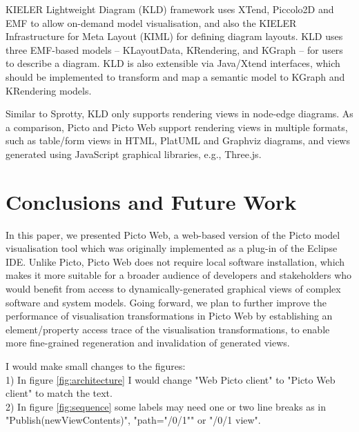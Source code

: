 \documentclass[sigconf,review]{acmart}
\begin{document}
KIELER Lightweight Diagram (KLD) framework \cite{schneider2013just} uses XTend, Piccolo2D and EMF to allow on-demand model visualisation, and also the KIELER Infrastructure for Meta Layout (KIML) for defining diagram layouts. KLD uses three EMF-based models -- KLayoutData, KRendering, and KGraph -- for users to describe a diagram. KLD is also extensible via Java/Xtend interfaces, which should be implemented to transform and map a semantic model to KGraph and KRendering models. 

Similar to Sprotty, KLD only supports rendering views in node-edge diagrams. As a comparison, Picto and Picto Web support rendering views in multiple formats, such as table/form views in HTML, PlatUML and Graphviz diagrams, and views generated using JavaScript graphical libraries, e.g., Three.js.


\section{Conclusions and Future Work}
\label{sec:conclusions_and_future_work}

In this paper, we presented Picto Web, a web-based version of the Picto model visualisation tool which was originally implemented as a plug-in of the Eclipse IDE. Unlike Picto, Picto Web does not require local software installation, which makes it more suitable for a broader audience of developers and stakeholders who would benefit from access to dynamically-generated graphical views of complex software and system models. Going forward, we plan to further improve the performance of visualisation transformations in Picto Web by establishing an element/property access trace of the visualisation transformations, to enable more fine-grained regeneration and invalidation of generated views.

{ \color{blue} 
I would make small changes to the figures:\\
1) In figure \ref{fig:architecture} I would change "Web Picto client" to "Picto Web client" to match the text. \\
2) In figure \ref{fig:sequence} some labels may need one or two line breaks as in  "Publish(newViewContents)", "path="/0/1"" or "/0/1 view".\\
}



\end{document}
